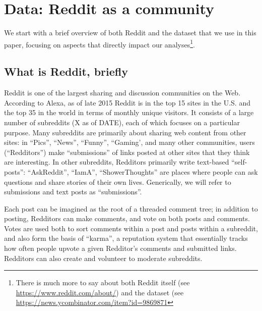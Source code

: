 \section{Data: Reddit as a community}

We start with a brief overview of both Reddit and the dataset that we use in this paper, focusing on aspects that directly impact our analyses\footnote{There is much more to say about both Reddit itself (see \url{https://www.reddit.com/about/}) and the dataset (see 
\url{https://news.ycombinator.com/item?id=9869871}}.

\subsection{What is Reddit, briefly}

Reddit is one of the largest sharing and discussion communities on the Web.  According to Alexa, as of late 2015 Reddit is in the top 15 sites in the U.S. and the top 35 in the world in terms of monthly unique visitors.  It consists of a large number of subreddits (X as of DATE), each of which focuses on a particular purpose.  Many subreddits are primarily about sharing web content from other sites: in ``Pics'', ``News'', ``Funny'', ``Gaming', and many other communities, users (``Redditors'') make ``submissions'' of links posted at other sites that they think are interesting.  In other subreddits, Redditors primarily write text-based ``self-posts'': ``AskReddit'', ``IamA'', ``ShowerThoughts'' are places where people can ask questions and share stories of their own lives.  Generically, we will refer to submissions and text posts as ``submissions''.  



Each post can be imagined as the root of a threaded comment tree; in addition to posting, Redditors can make comments, and vote on both posts and comments.  Votes are used both to sort comments within a post and posts within a subreddit, and also form the basis of ``karma'', a reputation system that essentially tracks how often people upvote a given Redditor's comments and submitted links.  Redditors can also create and volunteer to moderate subreddits.

